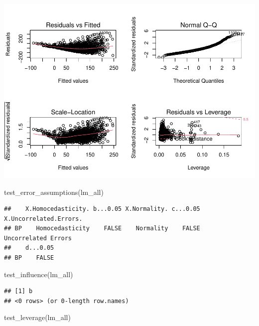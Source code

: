 \documentclass[
]{article}
\newenvironment{Shaded}{\begin{snugshade}}{\end{snugshade}}
\newcommand{\FunctionTok}[1]{\textcolor[rgb]{0.00,0.00,0.00}{#1}}
\newcommand{\NormalTok}[1]{#1}
\begin{document}
\includegraphics{Final_Project_1_files/figure-latex/unnamed-chunk-6-1.pdf}

\begin{Shaded}
\begin{Highlighting}[]
\FunctionTok{test\_error\_assumptions}\NormalTok{(lm\_all)}
\end{Highlighting}
\end{Shaded}

\begin{verbatim}
##    X.Homocedasticity. b...0.05 X.Normality. c...0.05 X.Uncorrelated.Errors.
## BP    Homocedasticity    FALSE    Normality    FALSE    Uncorrelated Errors
##    d...0.05
## BP    FALSE
\end{verbatim}

\begin{Shaded}
\begin{Highlighting}[]
\FunctionTok{test\_influence}\NormalTok{(lm\_all)}
\end{Highlighting}
\end{Shaded}

\begin{verbatim}
## [1] b
## <0 rows> (or 0-length row.names)
\end{verbatim}

\begin{Shaded}
\begin{Highlighting}[]
\FunctionTok{test\_leverage}\NormalTok{(lm\_all)}
\end{Highlighting}
\end{Shaded}
\end{document}
